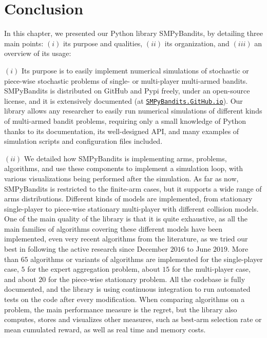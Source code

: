 



\newpage  %
\section{Conclusion}
\label{sec:3:conclusion}


In this chapter, we presented our Python library SMPyBandits, by detailing three main points:
$(i)$ its purpose and qualities,
$(ii)$ its organization,
and $(iii)$ an overview of its usage:
%

$(i)$
Its purpose is to easily implement numerical simulations of stochastic or piece-wise stochastic problems of single- or multi-player multi-armed bandits.
SMPyBandits is distributed on GitHub and Pypi freely, under an open-source license, and it is extensively documented (at \href{https://SMPyBandits.GitHub.io}{\texttt{SMPyBandits.GitHub.io}}).
Our library allows any researcher to easily run numerical simulations of different kinds of multi-armed bandit problems, requiring only a small knowledge of Python thanks to its documentation, its well-designed API, and many examples of simulation scripts and configuration files included.

$(ii)$
We detailed how SMPyBandits is implementing arms, problems, algorithms, and use these components to implement a simulation loop, with various visualizations being performed after the simulation.
As far as now, SMPyBandits is restricted to the finite-arm cases, but it supports a wide range of arms distributions.
Different kinds of models are implemented, from stationary single-player to piece-wise stationary multi-player with different collision models.
One of the main quality of the library is that it is quite exhaustive, as all the main families of algorithms covering these different models have been implemented, even very recent algorithms from the literature, as we tried our best in following the active research since December $2016$ to June $2019$.
More than $65$ algorithms or variants of algorithms are implemented for the single-player case, $5$ for the expert aggregation problem, about $15$ for the multi-player case, and about $20$ for the piece-wise stationary problem.
All the codebase is fully documented, and the library is using continuous integration to run automated tests on the code after every modification.
%
When comparing algorithms on a problem, the main performance measure is the regret, but the library also computes, stores and visualizes other measures, such as best-arm selection rate or mean cumulated reward, as well as real time and memory costs.

